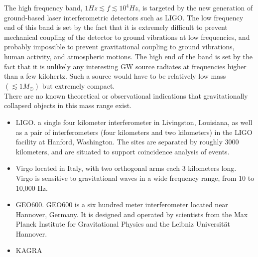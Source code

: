 \documentclass[binding=0.6cm, LaM]{sapthesis}
\begin{document}
	The high frequency band, $1Hz \apprle f \apprle 10^4 Hz$, is targeted by 
	the new generation of ground-based laser interferometric detectors such as LIGO.
	The low frequency end of this band is set by the fact that it is extremely difficult 
	to prevent mechanical coupling of the detector to ground vibrations at low frequencies,
	and probably impossible to prevent gravitational coupling to ground vibrations, human activity, and atmospheric motions.
	The high end of the band is set by the fact that it is unlikely any interesting GW source 
	radiates at frequencies higher than a few kilohertz. Such a source would have to be relatively
	low mass $(\apprle 1M_{\odot})$ but extremely compact. \\
	There are no known theoretical or observational indications that gravitationally collapsed objects in this mass range exist.

\begin{itemize}
			\item LIGO.
			      a single four kilometer interferometer in Livingston, Louisiana, 
			      as well as a pair of interferometers (four kilometers and two kilometers) in the LIGO facility at Hanford, Washington.
			      The sites are separated by roughly 3000 kilometers, and are situated to support coincidence analysis of events.
  			\item Virgo located in Italy, with two orthogonal arms each 3 kilometers long. 
			      Virgo is sensitive to gravitational waves in a wide frequency range, from 10 to 10,000 Hz. 
  			\item GEO600. GEO600 is a six hundred meter interferometer located near Hannover, 
			      Germany. It is designed and operated by scientists from the 
			      Max Planck Institute for Gravitational Physics and the Leibniz Universität Hannover.
  			\item KAGRA 

\end{itemize}
\end{document}
